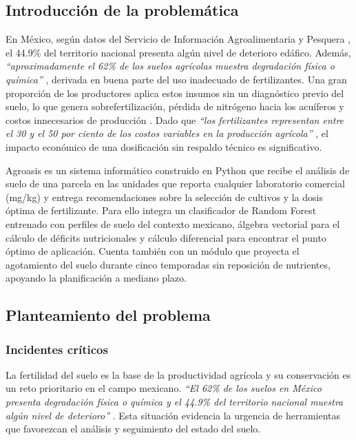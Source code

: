 \documentclass[12pt]{article}
\begin{document}
\subsection{Introducción de la problemática}

En México, según datos del Servicio de Información Agroalimentaria y Pesquera \citep{siap_2022}, el 44.9\% del territorio nacional presenta algún nivel de deterioro edáfico. Además, \textit{``aproximadamente el 62\% de los suelos agrícolas muestra degradación física o química''} \citep{fao_2015}, derivada en buena parte del uso inadecuado de fertilizantes. Una gran proporción de los productores aplica estos insumos sin un diagnóstico previo del suelo, lo que genera sobrefertilización, pérdida de nitrógeno hacia los acuíferos y costos innecesarios de producción \citep{obalum_2017}. Dado que \textit{``los fertilizantes representan entre el 30 y el 50 por ciento de los costos variables en la producción agrícola''} \citep{sader_2020}, el impacto económico de una dosificación sin respaldo técnico es significativo.

Agroasis es un sistema informático construido en Python que recibe el análisis de suelo de una parcela en las unidades que reporta cualquier laboratorio comercial (mg/kg) y entrega recomendaciones sobre la selección de cultivos y la dosis óptima de fertilizante. Para ello integra un clasificador de Random Forest \citep{breiman_2001} entrenado con perfiles de suelo del contexto mexicano, álgebra vectorial para el cálculo de déficits nutricionales y cálculo diferencial para encontrar el punto óptimo de aplicación. Cuenta también con un módulo que proyecta el agotamiento del suelo durante cinco temporadas sin reposición de nutrientes, apoyando la planificación a mediano plazo.

\subsection{Planteamiento del problema}

\subsubsection{Incidentes críticos}
La fertilidad del suelo es la base de la productividad agrícola y su conservación es un reto prioritario en el campo mexicano. \textit{``El 62\% de los suelos en México presenta degradación física o química y el 44.9\% del territorio nacional muestra algún nivel de deterioro''} \citep{fao_2015}. Esta situación evidencia la urgencia de herramientas que favorezcan el análisis y seguimiento del estado del suelo.
\end{document}
